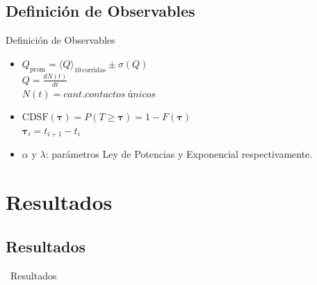 \documentclass{beamer}
\begin{document}
  \subsection{Definición de Observables}
  \begin{frame}{Definición de Observables}
    \begin{itemize}
      \item \(Q_{\text{prom}} = \langle Q \rangle_{10\,\text{corridas}} \pm \sigma(Q)\)
      \vspace{0.2cm}
      \\\(Q=\frac{dN(t)}{dt}\)
      \vspace{0.2cm}
      \\ \(N(t)=cant. contactos\ únicos\)
      \vspace{0.5cm}
      \item \(\text{CDSF}(\bm{\tau}) = P(T \ge \bm{\tau}) = 1 - F(\bm{\tau})\)
      \vspace{0.1cm}
      \\ \(\bm{\tau}_i=t_{i+1}-t_i\)
      \vspace{0.2cm}
      \item $ \alpha $ y $ \lambda $: parámetros Ley de Potencias y Exponencial respectivamente.
    \end{itemize}
  \end{frame}

  \section{Resultados}
  
  \subsection{Resultados}
  \begin{frame}
    \centering
    \colorbox{green!20!gray!30}{%
      \begin{minipage}{0.85\textwidth}
        \centering
        \vspace{0.5cm}
        {\Large\ Resultados}
        \vspace{0.5cm}
      \end{minipage}
    }
  \end{frame}
\end{document}
